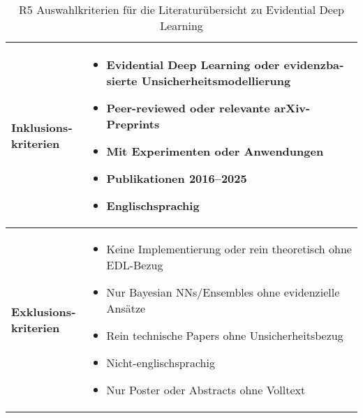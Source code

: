 \begin{otherlanguage}{ngerman}
\begin{table}[htbp]
\begin{tabularx}{\textwidth}{|l|X|}
\textbf{Inklusionskriterien} 
&
\begin{itemize}[leftmargin=*, noitemsep, topsep=0pt]
  \item Evidential Deep Learning oder evidenzbasierte Unsicherheitsmodellierung
  \item Peer-reviewed oder relevante arXiv-Preprints
  \item Mit Experimenten oder Anwendungen
  \item Publikationen 2016–2025
  \item Englischsprachig
\end{itemize}
\\ \hline

\textbf{Exklusionskriterien} &
\begin{itemize}[leftmargin=*, noitemsep, topsep=0pt]
  \item Keine Implementierung oder rein theoretisch ohne EDL-Bezug
  \item Nur Bayesian NNs/Ensembles ohne evidenzielle Ansätze
  \item Rein technische Papers ohne Unsicherheitsbezug
  \item Nicht-englischsprachig
  \item Nur Poster oder Abstracts ohne Volltext
\end{itemize}
\\ \hline

\end{tabularx}
\caption{R5 Auswahlkriterien für die Literaturübersicht zu Evidential Deep Learning}
\label{tab:auswahlkriterien}
\end{table}












\end{otherlanguage}
